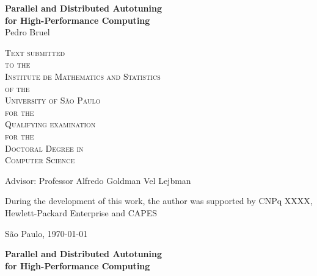 \documentclass[12pt,twoside,a4paper]{book}
\begin{document}
\frontmatter
\setcounter{tocdepth}{2}

\onehalfspacing  %

\thispagestyle{empty}
\begin{center}
    \vspace*{2.3cm}
    \textbf{\Large{Parallel and Distributed Autotuning \\
                   for High-Performance Computing}}\\

    \vspace*{1.2cm}
    \Large{Pedro Bruel}

    \vskip 2cm
    \textsc{
    Text submitted\\[-0.25cm]
    to the\\[-0.25cm]
    Institute de Mathematics and Statistics\\[-0.25cm]
    of the\\[-0.25cm]
    University of São Paulo\\[-0.25cm]
    for the\\[-0.25cm]
    Qualifying examination\\[-0.25cm]
    for the\\[-0.25cm]
    Doctoral Degree in\\[-0.25cm]
    Computer Science}

    \vskip 1.5cm
    Advisor: Professor Alfredo Goldman Vel Lejbman

       \vskip 1cm
    \normalsize{During the development of this work, the author was supported
    by CNPq \textnumero XXXX, Hewlett-Packard Enterprise and CAPES}

    \vskip 0.5cm
    \normalsize{São Paulo, \today}
\end{center}

%
%
%
\newpage
\thispagestyle{empty}
    \begin{center}
        \vspace*{2.3 cm}
        \textbf{\Large{Parallel and Distributed Autotuning\\
                       for High-Performance Computing}}\\
        \vspace*{2 cm}
    \end{center}
\end{document}
